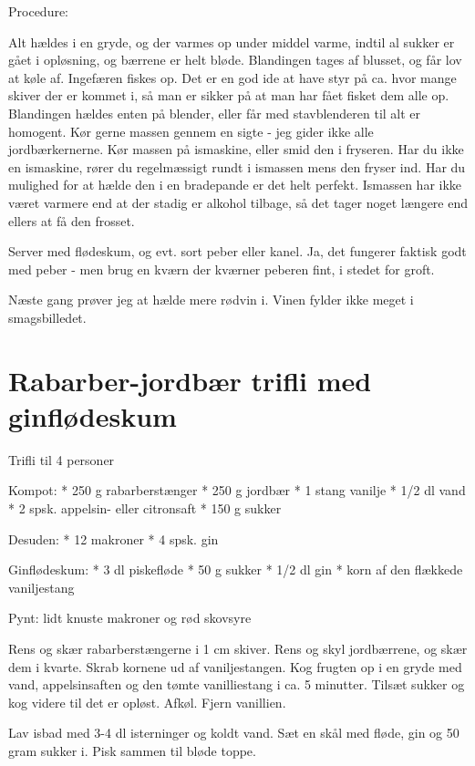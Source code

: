 \documentclass[
]{book}
\begin{document}
Procedure:

Alt hældes i en gryde, og der varmes op under middel varme, indtil al sukker er gået i opløsning, og bærrene er helt bløde.
Blandingen tages af blusset, og får lov at køle af. Ingefæren fiskes op. Det er en god ide at have styr på ca. hvor mange skiver der er kommet i, så man er sikker på at man har fået fisket dem alle op.
Blandingen hældes enten på blender, eller får med stavblenderen til alt er homogent. Kør gerne massen gennem en sigte - jeg gider ikke alle jordbærkernerne.
Kør massen på ismaskine, eller smid den i fryseren. Har du ikke en ismaskine, rører du regelmæssigt rundt i ismassen mens den fryser ind. Har du mulighed for at hælde den i en bradepande er det helt perfekt. Ismassen har ikke været varmere end at der stadig er alkohol tilbage, så det tager noget længere end ellers at få den frosset.

Server med flødeskum, og evt. sort peber eller kanel. Ja, det fungerer faktisk godt med peber - men brug en kværn der kværner peberen fint, i stedet for groft.

Næste gang prøver jeg at hælde mere rødvin i. Vinen fylder ikke meget i smagsbilledet.

\hypertarget{rabarber-jordbuxe6r-trifli-med-ginfluxf8deskum}{%
\section{Rabarber-jordbær trifli med ginflødeskum}\label{rabarber-jordbuxe6r-trifli-med-ginfluxf8deskum}}

Trifli til 4 personer

Kompot:
* 250 g rabarberstænger
* 250 g jordbær
* 1 stang vanilje
* 1/2 dl vand
* 2 spsk. appelsin- eller citronsaft
* 150 g sukker

Desuden:
* 12 makroner
* 4 spsk. gin

Ginflødeskum:
* 3 dl piskefløde
* 50 g sukker
* 1/2 dl gin
* korn af den flækkede vaniljestang

Pynt:
lidt knuste makroner og rød skovsyre

Rens og skær rabarberstængerne i 1 cm skiver. Rens og skyl jordbærrene, og skær
dem i kvarte. Skrab kornene ud af vaniljestangen.
Kog frugten op i en gryde med vand, appelsinsaften og den tømte vanilliestang
i ca. 5 minutter.
Tilsæt sukker og kog videre til det er opløst. Afkøl. Fjern vanillien.

Lav isbad med 3-4 dl isterninger og koldt vand. Sæt en skål med fløde,
gin og 50 gram sukker i. Pisk sammen til bløde toppe.
\end{document}
